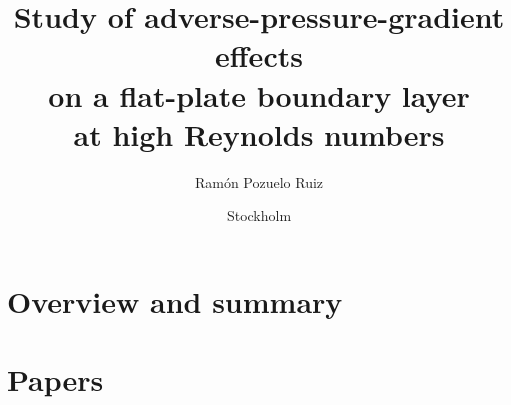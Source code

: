 \documentclass{MechThesis}
\title[{Study of adverse-pressure-gradient effects on a flat-plate boundary layer at high Reynolds numbers}]%
{%
	{Study of adverse-pressure-gradient effects \\on a flat-plate boundary layer\\ at high Reynolds numbers}
}%
\author{{Ram\'on Pozuelo Ruiz}}%
\affiliation
{%
	\highlight{ FLOW, Engineering Mechanics, KTH Royal Institute of Technology\\
	SE--100 44 Stockholm, Sweden%
	}
}%
\date{Stockholm}{{November}}{{2022}}%
\begin{document}
%
\frontmatter




%
\mainmatter

\part{Overview and summary}

%



%
\tocpagebreak


%
\part{Papers}

%
\makepapersummary
\cleardoublepage

%


%
% 

%
% 

%


%
% 

%
% 

%
% 

%
% 

\end{document}
